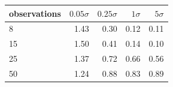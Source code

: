 \begin{tabular}{lrrrr}
\toprule
observations & $0.05\sigma$ & $0.25\sigma$ & $1\sigma$ & $5\sigma$ \\
\midrule
8 & 1.43 & 0.30 & 0.12 & 0.11 \\
15 & 1.50 & 0.41 & 0.14 & 0.10 \\
25 & 1.37 & 0.72 & 0.66 & 0.56 \\
50 & 1.24 & 0.88 & 0.83 & 0.89 \\
\bottomrule
\end{tabular}
